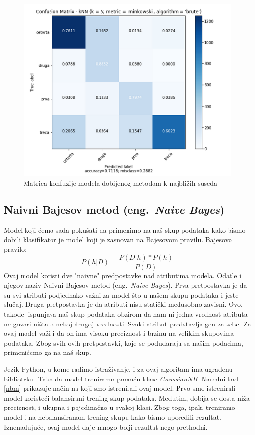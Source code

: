 \documentclass[a4paper]{article}
\begin{document}
\begin{figure}[h!]
\begin{center}
\includegraphics[scale=0.55]{kNN_k_5.png}
\end{center}
\caption{Matrica konfuzije modela dobijenog metodom k najbližih suseda}
\label{fig:kNN}
\end{figure}


\subsection{Naivni Bajesov metod (eng.~{\em Naive Bayes})}
Model koji ćemo sada pokušati da primenimo na naš skup podataka kako bismo dobili klasifikator je model koji je zasnovan na Bajesovom pravilu.
Bajesovo pravilo:
\[
    P(h|D) = \frac{P(D|h)*P(h)}{P(D)}
\]
Ovaj model koristi dve "naivne" predpostavke nad atributima modela. Odatle i njegov naziv Naivni Bajesov metod (eng.~{\em Naive Bayes}). Prva pretpostavka je da su svi atributi podjednako važni za model što u našem skupu podataka i jeste slučaj. Druga pretpostavka je da atributi nisu statički međusobno zavisni. Ovo, takođe, ispunjava naš skup podataka obzirom da nam ni jedna vrednost atributa ne govori ništa o nekoj drugoj vrednosti. Svaki atribut predstavlja gen za sebe. Za ovaj model važi i da on ima visoku preciznost i brzinu na velikim skupovima podataka. Zbog svih ovih pretpostavki, koje se podudaraju sa našim podacima, primenićemo ga na naš skup.

Jezik Python, u kome radimo istraživanje, i za ovaj algoritam ima ugrađenu biblioteku. Tako da model treniramo pomoću klase {\em GaussianNB}. Naredni kod \ref{nbm} prikazuje način na koji smo istrenirali ovaj model. Prvo smo istrenirali model koristeći balansirani trening skup podataka. Međutim, dobija se dosta niža preciznost, i ukupna i pojedinačno u svakoj klasi. Zbog toga, ipak, treniramo model i na nebalansiranom trening skupu kako bismo uporedili rezultat. Iznenađujuće, ovaj model daje mnogo bolji rezultat nego prethodni. 
\\
\end{document}
